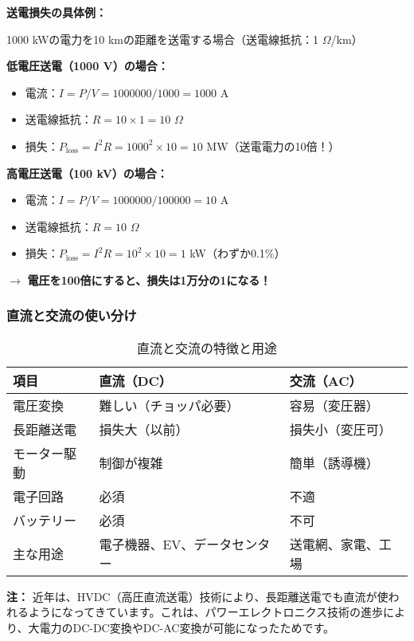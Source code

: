 \begin{screen}
\textbf{送電損失の具体例：}

1000 kWの電力を10 kmの距離を送電する場合（送電線抵抗：1 $\Omega$/km）

\textbf{低電圧送電（1000 V）の場合：}
\begin{itemize}
\item 電流：$I = P/V = 1000000/1000 = 1000$ A
\item 送電線抵抗：$R = 10 \times 1 = 10$ $\Omega$
\item 損失：$P_{\text{loss}} = I^2 R = 1000^2 \times 10 = 10$ MW（送電電力の10倍！）
\end{itemize}

\textbf{高電圧送電（100 kV）の場合：}
\begin{itemize}
\item 電流：$I = P/V = 1000000/100000 = 10$ A
\item 送電線抵抗：$R = 10$ $\Omega$
\item 損失：$P_{\text{loss}} = I^2 R = 10^2 \times 10 = 1$ kW（わずか0.1\%）
\end{itemize}

$\rightarrow$ \textbf{電圧を100倍にすると、損失は1万分の1になる！}
\end{screen}

\subsubsection{直流と交流の使い分け}

\begin{table}[H]
\centering
\caption{直流と交流の特徴と用途}
\begin{tabular}{|l|l|l|}
\hline
\textbf{項目} & \textbf{直流（DC）} & \textbf{交流（AC）} \\
\hline
\hline
電圧変換 & 難しい（チョッパ必要） & 容易（変圧器） \\
\hline
長距離送電 & 損失大（以前） & 損失小（変圧可） \\
\hline
モーター駆動 & 制御が複雑 & 簡単（誘導機） \\
\hline
電子回路 & 必須 & 不適 \\
\hline
バッテリー & 必須 & 不可 \\
\hline
主な用途 & 電子機器、EV、データセンター & 送電網、家電、工場 \\
\hline
\end{tabular}
\end{table}

\textbf{注：} 近年は、HVDC（高圧直流送電）技術により、長距離送電でも直流が使われるようになってきています。これは、パワーエレクトロニクス技術の進歩により、大電力のDC-DC変換やDC-AC変換が可能になったためです。

